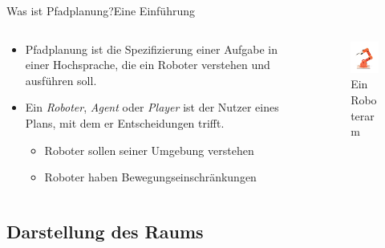\documentclass[t,aspectratio=169,dvipsnames]{beamer}
\begin{document}
\begin{frame}{Was ist Pfadplanung?}{Eine Einführung}
	\begin{columns}[T]
		\begin{column}[T]{0.6\textwidth}
			\begin{itemize}
				\item Pfadplanung ist die Spezifizierung einer Aufgabe in einer Hochsprache, die ein Roboter verstehen und ausführen soll.
				\newline\newline
				\item<2-> Ein \textit{Roboter}, \textit{Agent} oder \textit{Player} ist der Nutzer eines Plans, mit dem er Entscheidungen trifft.
				
				\begin{itemize}
					\item<2-> Roboter sollen seiner Umgebung verstehen
					\item<2-> Roboter haben Bewegungseinschränkungen
				\end{itemize}
			\end{itemize}
		\end{column}
		\begin{column}[T]{0.4\textwidth}
			\begin{figure}
				\includegraphics[width=4.0cm]{images/Bild1.png}
				\caption{Ein Roboterarm}
				
			\end{figure}
		\end{column}
	\end{columns}
\end{frame}

\subsection{Darstellung des Raums}
\end{document}
